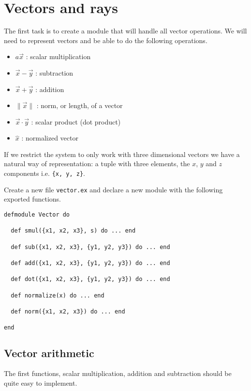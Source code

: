 \documentclass[a4paper,11pt]{article}
\begin{document}

\section{Vectors and rays}

The first task is to create a module that will handle all vector
operations. We will need to represent vectors and be able to do the
following operations.

\begin{itemize}
 \item $a\vec{x}$ : scalar multiplication
 \item $\vec{x} - \vec{y}$ : subtraction
 \item $\vec{x} + \vec{y}$ : addition
 \item $\|\vec{x}\|$ : norm, or length, of a vector
 \item $\vec{x} \cdot \vec{y}$ : scalar product (dot product)
 \item $\hat{x}$ : normalized vector
\end{itemize}

If we restrict the system to only work with three dimensional vectors
we have a natural way of representation: a tuple with three elements,
the $x$, $y$ and $z$ components i.e. {\tt \{x, y, z\}}. 

Create a new file {\tt vector.ex} and declare a new module with the
following exported functions.

\begin{verbatim}
defmodule Vector do

  def smul({x1, x2, x3}, s) do ... end

  def sub({x1, x2, x3}, {y1, y2, y3}) do ... end

  def add({x1, x2, x3}, {y1, y2, y3}) do ... end

  def dot({x1, x2, x3}, {y1, y2, y3}) do ... end  

  def normalize(x) do ... end

  def norm({x1, x2, x3}) do ... end

end
\end{verbatim}

\subsection*{Vector arithmetic}

The first functions, scalar multiplication, addition and subtraction
should be quite easy to implement.
\end{document}
